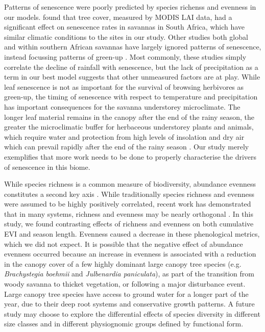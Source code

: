 \documentclass[11pt,a4paper]{article}
\begin{document}
Patterns of senescence were poorly predicted by species richenss and evenness in our models. \citet{Cho2017} found that tree cover, measured by MODIS LAI data, had a significant effect on senescence rates in savannas in South Africa, which have similar climatic conditions to the sites in our study. Other studies both global and within southern African savannas have largely ignored patterns of senescence, instead focussing patterns of green-up \citep{}. Most commonly, these studies simply correlate the decline of rainfall with senescence, but the lack of precipitation as a term in our best model suggests that other unmeasured factors are at play. While leaf senescence is not as important for the survival of browsing herbivores as green-up, the timing of senescence with respect to temperature and precipitation has important consequences for the savanna understorey microclimate. The longer leaf material remains in the canopy after the end of the rainy season, the greater the microclimatic buffer for herbaceous understorey plants and animals, which require water and protection from high levels of insolation and dry air which can prevail rapidly after the end of the rainy season \citep{}. Our study merely exemplifies that more work needs to be done to properly characterise the drivers of senescence in this biome.

While species richness is a common measure of biodiversity, abundance evenness constitutes a second key axis \citep{Wilsey2005, Hillebrand2008}. While traditionally species richness and evenness were assumed to be highly positively correlated, recent work has demonstrated that in many systems, richness and evenness may be nearly orthogonal \citep{}. In this study, we found contrasting effects of richness and evenness on both cumulative EVI and season length. Evenness caused a decrease in these phenological metrics, which we did not expect. It is possible that the negative effect of abundance evenness occurred because an increase in evenness is associated with a reduction in the canopy cover of a few highly dominant large canopy tree species (e.g. \textit{Brachystegia boehmii} and \textit{Julbenardia paniculata}), as part of the transition from woody savanna to thicket vegetation, or following a major disturbance event. Large canopy tree species have access to ground water for a longer part of the year, due to their deep root systems and conservative growth patterns. A future study may choose to explore the differential effects of species diversity in different size classes and in different physiognomic groups defined by functional form.
\end{document}
